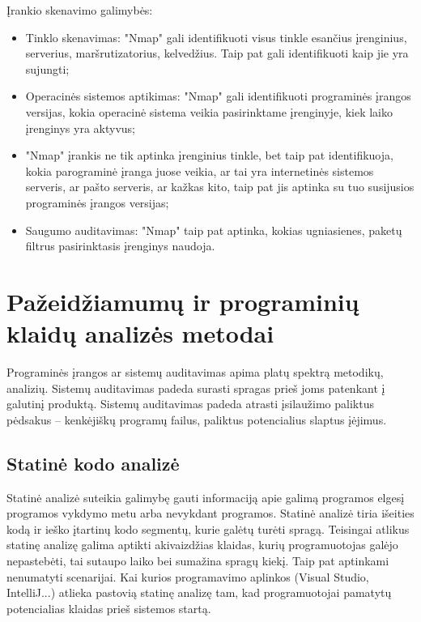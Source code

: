 \documentclass[a4paper,12pt,fleqn]{article}
\begin{document}
Įrankio skenavimo galimybės:
\begin{itemize}
	\item Tinklo skenavimas: "Nmap" gali identifikuoti visus tinkle esančius įrenginius, serverius, maršrutizatorius, kelvedžius. Taip pat gali identifikuoti kaip jie yra sujungti;
	\item Operacinės sistemos aptikimas: "Nmap" gali identifikuoti  programinės įrangos versijas, kokia operacinė sistema veikia pasirinktame įrenginyje, kiek laiko įrenginys yra aktyvus;
	\item "Nmap" įrankis ne tik aptinka įrenginius tinkle, bet taip pat identifikuoja, kokia parograminė įranga juose veikia, ar tai yra internetinės sistemos serveris, ar pašto serveris, ar kažkas kito, taip pat jis aptinka su tuo susijusios programinės įrangos versijas;
	\item Saugumo auditavimas: "Nmap" taip pat aptinka, kokias ugniasienes, paketų filtrus pasirinktasis įrenginys naudoja.
\end{itemize}

\newpage
\section{Pažeidžiamumų ir programinių klaidų analizės metodai}
\label{sec:sec2}

Programinės įrangos ar sistemų auditavimas apima platų spektrą metodikų, analizių. Sistemų auditavimas padeda surasti spragas prieš joms patenkant į galutinį produktą. Sistemų auditavimas padeda atrasti įsilaužimo paliktus pėdsakus – kenkėjiškų programų failus, paliktus potencialius slaptus įėjimus. 

\subsection{Statinė kodo analizė}
\label{sec:example}

\label{sec:data}
Statinė analizė suteikia galimybę gauti informaciją apie galimą programos elgesį programos vykdymo metu arba nevykdant programos. Statinė analizė tiria išeities kodą ir ieško įtartinų kodo segmentų, kurie galėtų turėti spragą. Teisingai atlikus statinę analizę galima aptikti akivaizdžias klaidas, kurių programuotojas galėjo nepastebėti, tai sutaupo laiko bei sumažina spragų kiekį. Taip pat aptinkami nenumatyti scenarijai\cite{Cowan:2003:SSO:858866.859050}. Kai kurios programavimo aplinkos (Visual Studio, IntelliJ...) atlieka pastovią statinę analizę tam, kad programuotojai pamatytų potencialias klaidas prieš sistemos startą. 
\end{document}
